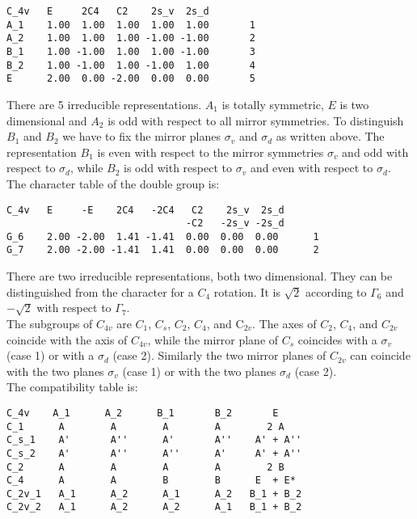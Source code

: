 \documentclass[12pt,a4paper,twoside]{report}
\begin{document}
\begin{tcolorbox}
\begin{footnotesize}
\begin{verbatim}
C_4v   E     2C4   C2    2s_v  2s_d 
A_1    1.00  1.00  1.00  1.00  1.00       1
A_2    1.00  1.00  1.00 -1.00 -1.00       2
B_1    1.00 -1.00  1.00  1.00 -1.00       3
B_2    1.00 -1.00  1.00 -1.00  1.00       4
E      2.00  0.00 -2.00  0.00  0.00       5
\end{verbatim}
\end{footnotesize}
\end{tcolorbox}

There are 5 irreducible representations. $A_1$ is totally symmetric, $E$ is
two dimensional and $A_2$ is odd with respect to all mirror symmetries.
To distinguish $B_1$ and $B_2$ we have to fix the mirror planes
$\sigma_v$ and $\sigma_d$ as written above. 
The representation $B_1$ is even with respect to the mirror symmetries
$\sigma_v$ and odd with respect to $\sigma_d$, while $B_2$ is odd with respect to
$\sigma_v$ and even with respect to $\sigma_d$. \\
The character table of the double group is:

\begin{tcolorbox}
\begin{footnotesize}
\begin{verbatim}
C_4v   E     -E    2C4   -2C4   C2    2s_v  2s_d
                               -C2   -2s_v -2s_d
G_6    2.00 -2.00  1.41 -1.41  0.00  0.00  0.00      1
G_7    2.00 -2.00 -1.41  1.41  0.00  0.00  0.00      2
\end{verbatim}
\end{footnotesize}
\end{tcolorbox}

There are two irreducible representations, both two dimensional. They can be
distinguished from the character for a $C_4$ rotation. It is
$\sqrt{2}$ according to $\Gamma_6$ and $-\sqrt{2}$ with respect to 
$\Gamma_7$. \\
The subgroups of $C_{4v}$ are $C_1$, $C_s$, $C_2$, $C_4$, and C$_{2v}$. 
The axes of $C_2$, $C_4$, and $C_{2v}$ coincide with the axis of $C_{4v}$, 
while the mirror plane of $C_s$ coincides with a $\sigma_v$ 
(case 1) or with a $\sigma_d$ (case 2). Similarly the two
mirror planes of $C_{2v}$ can coincide with the two planes $\sigma_v$ 
(case 1) or with the two planes $\sigma_d$ (case 2).\\
The compatibility table is:

\begin{tcolorbox}
\begin{footnotesize}
\begin{verbatim}
C_4v    A_1      A_2      B_1       B_2       E
C_1      A        A        A        A        2 A
C_s_1    A'       A''      A'       A''    A' + A''
C_s_2    A'       A''      A''      A'     A' + A''
C_2      A        A        A        A        2 B
C_4      A        A        B        B      E  + E*   
C_2v_1   A_1      A_2      A_1      A_2   B_1 + B_2
C_2v_2   A_1      A_2      A_2      A_1   B_1 + B_2
\end{verbatim}
\end{footnotesize}
\end{tcolorbox}
\end{document}
